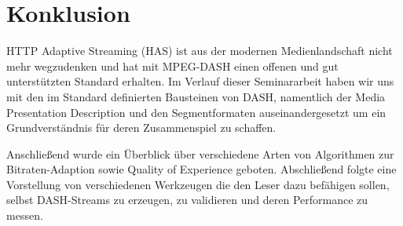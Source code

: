\documentclass[paper = a4, fontsize = 12pt, parskip = half]{scrartcl} %
\begin{document}
\section{Konklusion}
HTTP Adaptive Streaming (HAS) ist aus der modernen Medienlandschaft nicht mehr wegzudenken und hat mit MPEG-DASH einen offenen und gut unterstützten Standard erhalten. Im Verlauf dieser Seminararbeit haben wir uns mit den im Standard definierten Bausteinen von DASH, namentlich der Media Presentation Description und den Segmentformaten auseinandergesetzt um ein Grundverständnis für deren Zusammenspiel zu schaffen.

Anschließend wurde ein Überblick über verschiedene Arten von Algorithmen zur Bitraten-Adaption sowie Quality of Experience geboten. Abschließend folgte eine Vorstellung von verschiedenen Werkzeugen die den Leser dazu befähigen sollen, selbst DASH-Streams zu erzeugen, zu validieren und deren Performance zu messen.


\newpage
\printbibliography
\end{document}
